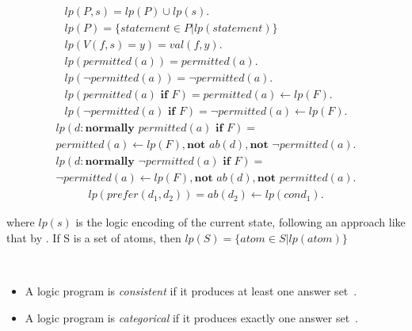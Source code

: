 \begin{gather*}
    lp(P,s) = lp(P)\cup lp(s). \\
    lp(P)=\{statement \in P | lp(statement)\} \\
    lp\left(V(f,s)=y\right) =
        val\left(f,y\right). \\
    lp(permitted(a)) =
        permitted(a). \\
    lp(\neg permitted(a)) =
        \neg permitted(a). \\
    lp(permitted(a) \textbf{ if } F) =
        permitted(a) \leftarrow
            lp(F). \\
    lp(\neg permitted(a) \textbf{ if } F) =
        \neg permitted(a) \leftarrow
            lp(F).
\end{gather*}
\begin{multline*}
    lp(d: \textbf{normally } permitted(a) \textbf{ if } F) = \\
        permitted(a) \leftarrow
            lp(F),
            \textbf{not } ab(d),
            \textbf{not } \neg permitted(a).
\end{multline*}
\begin{multline*}
    lp(d: \textbf{normally } \neg permitted(a) \textbf{ if } F) = \\
        \neg permitted(a) \leftarrow
        lp(F),
        \textbf{not } ab(d),
        \textbf{not } permitted(a).
\end{multline*}
\begin{gather*}
    lp(prefer(d_1, d_2)) =
        ab(d_2) \leftarrow lp(cond_1).
\end{gather*}

\noindent
where $lp(s)$ is the logic encoding of the current state, following an approach like that by \citet{balduccini_aaa_2008}.
If S is a set of atoms, then $lp(S)=\{atom \in S | lp(atom)\}$

\begin{definition}
    \label{def:lp_consistent}
    \label{def:lp_categorical}
    ~

    \begin{itemize}
        \item A logic program is \textit{consistent} if it produces at least one answer set~\citep{gelfond_authorization_2008}.
        \item A logic program is \textit{categorical} if it produces exactly one answer set~\citep{gelfond_authorization_2008}.
    \end{itemize}
\end{definition}

